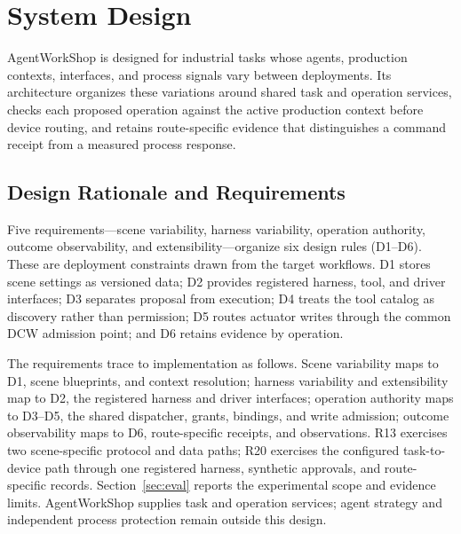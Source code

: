 \section{System Design}
\label{sec:design}
AgentWorkShop is designed for industrial tasks whose agents, production
contexts, interfaces, and process signals vary between deployments. Its
architecture organizes these variations around shared task and operation
services, checks each proposed operation against the active production
context before device routing, and retains route-specific evidence that
distinguishes a command receipt from a measured process response.

\subsection{Design Rationale and Requirements}
\label{sec:principles}
Five requirements---scene variability, harness variability, operation
authority, outcome observability, and extensibility---organize six design
rules (D1--D6). These are deployment constraints drawn from the target
workflows. D1 stores scene settings as versioned data;
D2 provides registered harness, tool, and driver interfaces; D3 separates
proposal from execution; D4 treats the tool catalog as discovery rather than
permission; D5 routes actuator writes through the common DCW admission point;
and D6 retains evidence by operation.

The requirements trace to implementation as follows.
Scene variability maps to D1, scene blueprints, and context resolution;
harness variability and extensibility map to D2, the registered harness and
driver interfaces; operation authority maps to D3--D5, the shared dispatcher,
grants, bindings, and write admission; outcome observability maps to D6,
route-specific receipts, and observations. R13 exercises two scene-specific
protocol and data paths; R20 exercises the configured task-to-device path
through one registered harness, synthetic approvals, and route-specific
records. Section~\ref{sec:eval} reports the experimental scope and evidence
limits. AgentWorkShop supplies task and operation services; agent strategy
and independent process protection remain outside this design.

